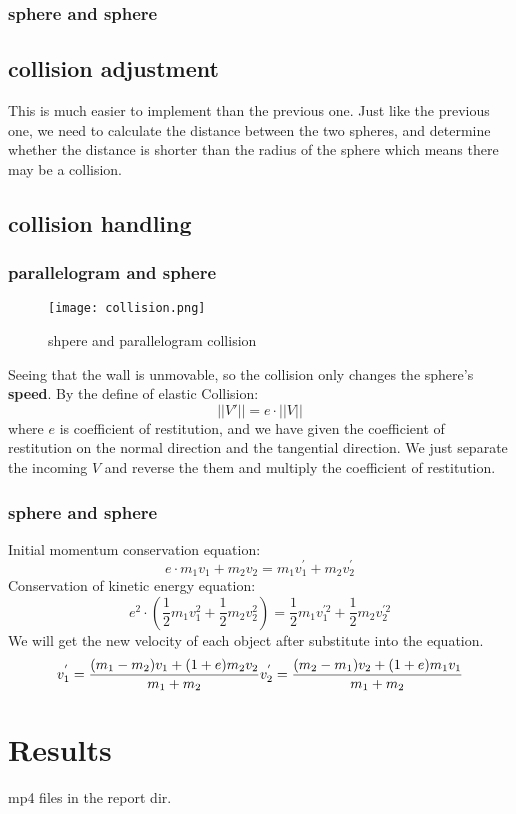 \documentclass[acmtog]{acmart}
\begin{document}
\subsubsection{sphere and sphere}
\subsection{collision adjustment}
This is much easier to implement than the previous one. Just like the previous one, we need to calculate the distance between the two spheres, and determine whether the distance is shorter than the radius of the sphere which means there may be a collision.
\subsection{collision handling}

\subsubsection{parallelogram and sphere}
\begin{figure}[h]
	\centering
	\texttt{[image: collision.png]}
	\caption{shpere and parallelogram collision}
\end{figure}
Seeing that the wall is unmovable, so the collision only changes the sphere's \textbf{speed}. By the define of elastic Collision:
\[
	||V'|| = e\cdot || V ||
\]
where $e$ is coefficient of restitution, and we have given the coefficient of restitution on the normal direction and the tangential direction.
We just separate the incoming $V$ and reverse the them and multiply the coefficient of restitution.
\subsubsection{sphere and sphere}
Initial momentum conservation equation:
\[
	e \cdot m_{1}v_{1}+m_{2}v_{2}=m_{1}v_{1}^{'}+m_{2}v_{2}^{'}
\]
Conservation of kinetic energy equation:
\[
	e^2 \cdot( \frac{1}{2}m_{1}v_{1}^{2}+\frac{1}{2}m_{2}v_{2}^{2})=\frac{1}{2}m_{1}v_{1}^{'2}+\frac{1}{2}m_{2}v_{2}^{'2}
\]
We will get the new velocity of each object after substitute into the equation.
\[
	v_{1}^{'}=\frac{(m_{1}-m_{2})v_{1}+(1+e)m_{2}v_{2}}{ m_{1}+m_{2}  } \\
	v_{2}^{'}=\frac{(m_{2}-m_{1})v_{2}+(1+e)m_{1}v_{1}}{ m_{1}+m_{2}  }
\]

\section{Results}
 mp4 files in the report dir.
\end{document}
